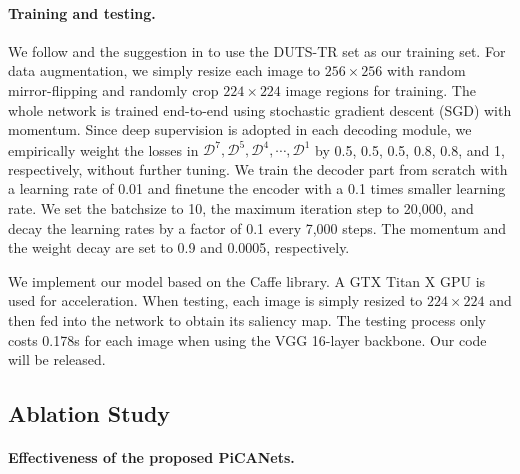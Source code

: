 \documentclass[10pt,twocolumn,letterpaper]{article}
\begin{document}
\paragraph{Training and testing.}
We follow \cite{Wang2017srm} and the suggestion in \cite{wang2017duts} to use the DUTS-TR set as our training set. For data augmentation, we simply resize each image to $256\times 256$ with random mirror-flipping and randomly crop $224\times 224$ image regions for training. The whole network is trained end-to-end using stochastic gradient descent (SGD) with momentum. Since deep supervision is adopted in each decoding module, we empirically weight the losses in $\mathcal D^7,\mathcal D^5,\mathcal D^4,\cdots,\mathcal D^1$ by 0.5, 0.5, 0.5, 0.8, 0.8, and 1, respectively, without further tuning. We train the decoder part from scratch with a learning rate of 0.01 and finetune the encoder with a 0.1 times smaller learning rate. We set the batchsize to 10, the maximum iteration step to 20,000, and decay the learning rates by a factor of 0.1 every 7,000 steps. The momentum and the weight decay are set to 0.9 and 0.0005, respectively.

We implement our model based on the Caffe \cite{jia2014caffe} library. A GTX Titan X GPU is used for acceleration. When testing, each image is simply resized to $224\times 224$ and then fed into the network to obtain its saliency map. The testing process only costs 0.178s for each image when using the VGG 16-layer backbone. Our code will be released.
\subsection{Ablation Study}\label{sec:ablation}

\paragraph{Effectiveness of the proposed PiCANets.}
\end{document}
